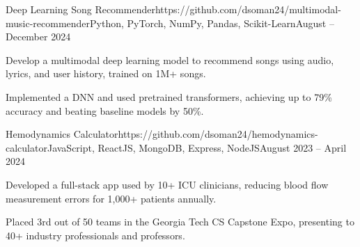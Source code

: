 \documentclass{article}
\begin{document}
\begin{flushleft}

    \vspace{3pt}

    \begin{project}{Deep Learning Song Recommender}{https://github.com/dsoman24/multimodal-music-recommender}{Python, PyTorch, NumPy, Pandas, Scikit-Learn}{August -- December 2024}
        \item Develop a multimodal deep learning model to recommend songs using audio, lyrics, and user history, trained on 1M+ songs.
        \item Implemented a DNN and used pretrained transformers, achieving up to 79\% accuracy and beating baseline models by 50\%.
    \end{project}

    \begin{project}{Hemodynamics Calculator}{https://github.com/dsoman24/hemodynamics-calculator}{JavaScript, ReactJS, MongoDB, Express, NodeJS}{August 2023 -- April 2024}
        \item Developed a full-stack app used by 10+ ICU clinicians, reducing blood flow measurement errors for 1,000+ patients annually.
        \item Placed 3rd out of 50 teams in the Georgia Tech CS Capstone Expo, presenting to 40+ industry professionals and professors.
    \end{project}




    \vspace{3pt}
     \\
     \\
     \\

\end{flushleft}
\end{document}
